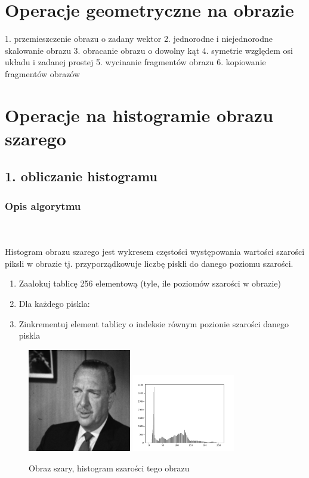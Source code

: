 \documentclass[final,a4paper,openany,12pt]{mwbk}
\begin{document}
\chapter{Operacje geometryczne na obrazie}
1. przemieszczenie obrazu o zadany wektor
2. jednorodne i niejednorodne skalowanie obrazu
3. obracanie obrazu o dowolny kąt
4. symetrie względem osi układu i zadanej prostej
5. wycinanie fragmentów obrazu
6. kopiowanie fragmentów obrazów

\chapter{Operacje na histogramie obrazu szarego}
\pagebreak
\section*{1. obliczanie histogramu}
\subsection*{Opis algorytmu}
\hfill
\\\\
\indent 
Histogram obrazu szarego jest wykresem częstości występowania wartości szarości piksli w obrazie tj.
przyporządkowuje liczbę piskli do danego poziomu szarości.\newline
\begin{enumerate}
	\item Zaalokuj tablicę 256 elementową (tyle, ile poziomów szarości w obrazie)
	\item Dla każdego piskla:
	\item Zinkrementuj element tablicy o indeksie równym pozionie szarości danego piskla
\end{enumerate}

\begin{figure}[H]
	\begin{center}
		\includegraphics[width=0.4\textwidth]{gentelman_gray}
		\includegraphics[width=0.4\textwidth]{gentelman_gray_histogram}
	\end{center}
	\caption{Obraz szary, histogram szarości tego obrazu}
\end{figure}
\end{document}
